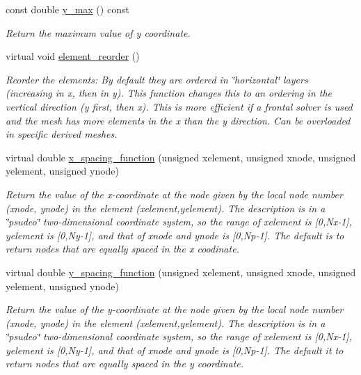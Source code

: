 \begin{DoxyCompactItemize}
const double \hyperlink{classoomph_1_1RectangularQuadMesh_a7d4a00a545efc20451b00a9b8ad1e17d}{y\+\_\+max} () const
\begin{DoxyCompactList}\small\item\em Return the maximum value of y coordinate. \end{DoxyCompactList}\item 
virtual void \hyperlink{classoomph_1_1RectangularQuadMesh_ae1e1d67808d4efb6e16a3835162a4504}{element\+\_\+reorder} ()
\begin{DoxyCompactList}\small\item\em Reorder the elements\+: By default they are ordered in \char`\"{}horizontal\char`\"{} layers (increasing in x, then in y). This function changes this to an ordering in the vertical direction (y first, then x). This is more efficient if a frontal solver is used and the mesh has more elements in the x than the y direction. Can be overloaded in specific derived meshes. \end{DoxyCompactList}\item 
virtual double \hyperlink{classoomph_1_1RectangularQuadMesh_ad4c2f349cf201cb3107f0a4e5447c16f}{x\+\_\+spacing\+\_\+function} (unsigned xelement, unsigned xnode, unsigned yelement, unsigned ynode)
\begin{DoxyCompactList}\small\item\em Return the value of the x-\/coordinate at the node given by the local node number (xnode, ynode) in the element (xelement,yelement). The description is in a \char`\"{}psudeo\char`\"{} two-\/dimensional coordinate system, so the range of xelement is \mbox{[}0,Nx-\/1\mbox{]}, yelement is \mbox{[}0,Ny-\/1\mbox{]}, and that of xnode and ynode is \mbox{[}0,Np-\/1\mbox{]}. The default is to return nodes that are equally spaced in the x coodinate. \end{DoxyCompactList}\item 
virtual double \hyperlink{classoomph_1_1RectangularQuadMesh_ae78204de1f176cdf2e819673bd34e78a}{y\+\_\+spacing\+\_\+function} (unsigned xelement, unsigned xnode, unsigned yelement, unsigned ynode)
\begin{DoxyCompactList}\small\item\em Return the value of the y-\/coordinate at the node given by the local node number (xnode, ynode) in the element (xelement,yelement). The description is in a \char`\"{}psudeo\char`\"{} two-\/dimensional coordinate system, so the range of xelement is \mbox{[}0,Nx-\/1\mbox{]}, yelement is \mbox{[}0,Ny-\/1\mbox{]}, and that of xnode and ynode is \mbox{[}0,Np-\/1\mbox{]}. The default it to return nodes that are equally spaced in the y coordinate. \end{DoxyCompactList}\end{DoxyCompactItemize}
